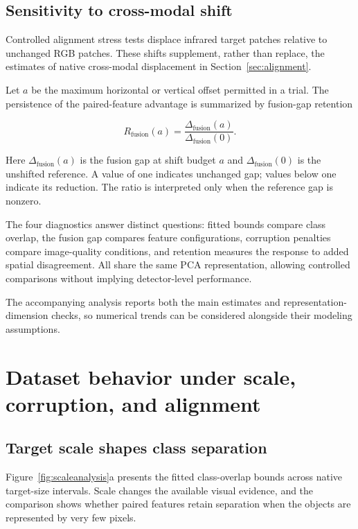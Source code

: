\documentclass[10pt]{article}
\newcommand{\bfg}{\Delta_{\mathrm{fusion}}}
\begin{document}
\subsection{Sensitivity to cross-modal shift}

Controlled alignment stress tests displace infrared target patches relative to unchanged RGB patches. These shifts supplement, rather than replace, the estimates of native cross-modal displacement in Section~\ref{sec:alignment}.

Let $a$ be the maximum horizontal or vertical offset permitted in a trial. The persistence of the paired-feature advantage is summarized by fusion-gap retention

\begin{equation}
R_{\mathrm{fusion}}(a)
=
\frac{\bfg(a)}
{\bfg(0)}.
\label{eq:retention}
\end{equation}

Here $\bfg(a)$ is the fusion gap at shift budget $a$ and $\bfg(0)$ is the unshifted reference. A value of one indicates unchanged gap; values below one indicate its reduction. The ratio is interpreted only when the reference gap is nonzero.

The four diagnostics answer distinct questions: fitted bounds compare class overlap, the fusion gap compares feature configurations, corruption penalties compare image-quality conditions, and retention measures the response to added spatial disagreement. All share the same PCA representation, allowing controlled comparisons without implying detector-level performance.

The accompanying analysis reports both the main estimates and representation-dimension checks, so numerical trends can be considered alongside their modeling assumptions.


\section{Dataset behavior under scale, corruption, and alignment}
\label{sec:findings}

\subsection{Target scale shapes class separation}

Figure~\ref{fig:scaleanalysis}a presents the fitted class-overlap bounds across native target-size intervals. Scale changes the available visual evidence, and the comparison shows whether paired features retain separation when the objects are represented by very few pixels.
\end{document}
